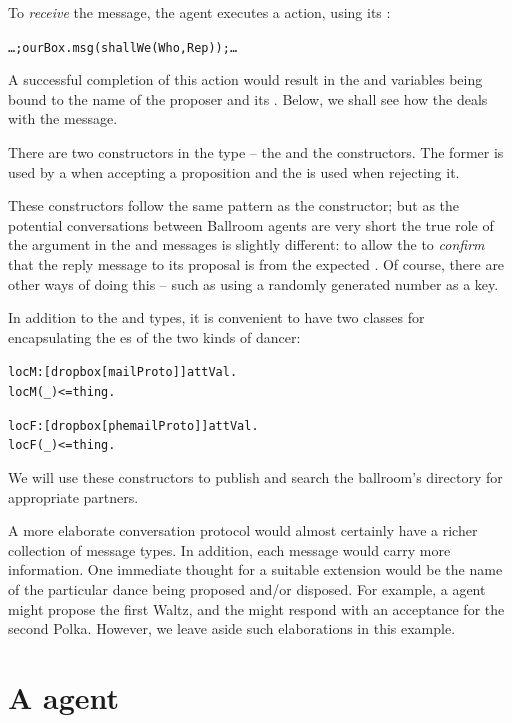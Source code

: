 To \emph{receive} the  message, the \phemail agent executes a  action, using its :
\begin{alltt}
\ldots;ourBox.msg(shallWe(Who,Rep));\ldots
\end{alltt}
A successful completion of this action would result in the  and  variables being bound to the name of the proposer and its . Below, we shall see how the \phemail deals with the message.

There are two constructors in the  type -- the  and the  constructors. The former is used by a \phemail when accepting a proposition and the  is used when rejecting it.

These constructors follow the same pattern as the  constructor; but as the potential conversations between Ballroom agents are very short the true role of the  argument in the  and  messages is slightly different: to allow the \mail to \emph{confirm} that the reply message to its  proposal is from the expected \phemail. Of course, there are other ways of doing this -- such as using a randomly generated number as a key.


In addition to the  and  types, it is convenient to have two  classes for encapsulating the es of the two kinds of dancer:
\begin{alltt}
locM:[dropbox[mailProto]]\conarrow{}attVal.
locM(_)<=thing.

locF:[dropbox[phemailProto]]\conarrow{}attVal.
locF(_)<=thing.
\end{alltt}
We will use these constructors to publish and search the ballroom's directory for appropriate partners.


\begin{aside}
A more elaborate conversation protocol would almost certainly have a richer collection of message types. In addition, each message would carry more information. One immediate thought for a suitable extension would be the name of the particular dance being proposed and/or disposed. For example, a \mail agent might propose the first Waltz, and the \phemail might respond with an acceptance for the second Polka. However, we leave aside such elaborations in this example.
\end{aside}

\section{A \mail agent}
\label{dance:mail}

